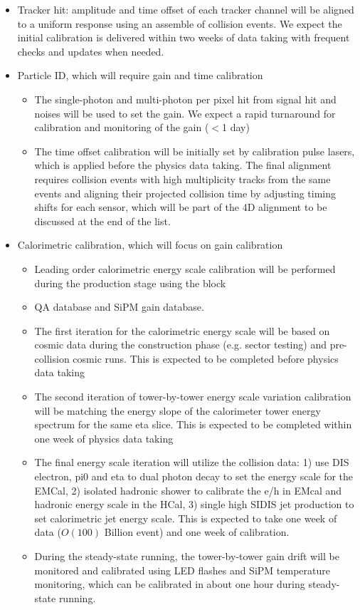 \begin{itemize}
\item Tracker hit: amplitude and time offset of each tracker channel will be aligned to a uniform response using an assemble of collision events. We expect the initial calibration is delivered within two weeks of data taking with frequent checks and updates when needed. 
\item Particle ID, which will require gain and time calibration
\begin{itemize}
  \item The single-photon and multi-photon per pixel hit from signal hit and noises will be used to set the gain. We expect a rapid turnaround for calibration and monitoring of the gain ($<$1 day)
  \item The time offset calibration will be initially set by calibration pulse lasers, which is applied before the physics data taking. The final alignment requires collision events with high multiplicity tracks from the same events and aligning their projected collision time by adjusting timing shifts for each sensor, which will be part of the 4D alignment to be discussed at the end of the list. 
\end{itemize}
\item Calorimetric calibration, which will focus on gain calibration
\begin{itemize}
  \item Leading order calorimetric energy scale calibration will be performed during the production stage using the block 
  \item QA database and SiPM gain database. 
  \item The first iteration for the calorimetric energy scale will be based on cosmic data during the construction phase (e.g. sector testing) and pre-collision cosmic runs. This is expected to be completed before physics data taking
  \item The second iteration of tower-by-tower energy scale variation calibration will be matching the energy slope of the calorimeter tower energy spectrum for the same eta slice.   This is expected to be completed within one week of physics data taking
  \item The final energy scale iteration will utilize the collision data: 1) use DIS electron, pi0 and eta to dual photon decay to set the energy scale for the EMCal, 2) isolated hadronic shower to calibrate the e/h in EMcal and hadronic energy scale in the HCal, 3) single high SIDIS jet production to set calorimetric jet energy scale. This is expected to take one week of data ($O(100)$ Billion event) and one week of calibration. 
  \item During the steady-state running, the tower-by-tower gain drift will be monitored and calibrated using LED flashes and SiPM temperature monitoring, which can be calibrated in about one hour during steady-state running. 
\end{itemize}


\end{itemize}

